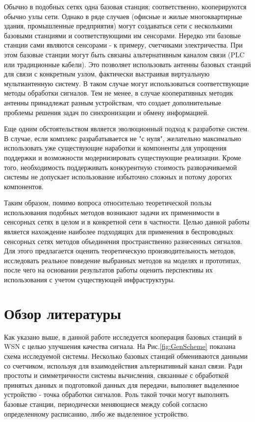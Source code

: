 \documentclass[a4paper,12pt,oneside, abstract=true]{scrartcl}
\begin{document}
Обычно в подобных сетях одна базовая станция; соответственно, кооперируются обычно узлы сети. 
Однако в ряде случаев (офисные и жилые многоквартирные здания, промышленные предприятия) могут создаваться сети с несколькими базовыми станциями и соответствующими им сенсорами. 
Нередко эти базовые станции сами являются сенсорами - к примеру, счетчиками электричества. 
При этом базовые станции могут быть связаны альтернативным каналом связи (PLC или традиционные кабели). 
Это позволяет использовать антенны базовых станций для связи с конкретным узлом, фактически выстраивая виртуальную мультиантенную систему. 
В таком случае могут использоваться соответствующие методы обработки сигналов. 
Тем не менее, в случае кооперативных методик антенны принадлежат разным устройствам, что создает дополнительные проблемы решения задач по синхронизации и обмену информацией. 

Еще одним обстоятельством является эволюционный подход к разработке систем. 
В случае, если комплекс разрабатывается не "с нуля", желательно максимально использовать уже существующие наработки и компоненты для упрощения поддержки и возможности модернизировать существующие реализации. 
Кроме того, необходимость поддерживать конкурентную стоимость разворачиваемой системы не допускает использование избыточно сложных и потому дорогих компонентов.

Таким образом, помимо вопроса относительно теоретической пользы использования подобных методов возникают задачи их применимости в сенсорных сетях в целом и в конкретной сети в частности.
Целью данной работы является нахождение наиболее подходящих для применения в беспроводных сенсорных сетях методов объединения пространственно разнесенных сигналов.
Для этого предлагается оценить теоретическую производительность методов, исследовать реальное поведение выбранных методов на моделях и прототипах, после чего на основании результатов работы оценить перспективы их использования с учетом существующей инфраструктуры.
\clearpage

\section{Обзор литературы}

Как указано выше, в данной работе исследуется кооперация базовых станций в WSN с целью улучшения качества сигнала.
На Рис.\ref{fig:GenScheme} показана схема исследуемой системы. 
Несколько базовых станций обмениваются данными со счетчиком, используя для взаимодействия альтернативный канал связи. 
Ради простоты и симметричности системы вычисления, связанные с обработкой принятых данных и подготовкой данных для передачи, выполняет выделенное устройство - точка обработки сигналов. 
Роль такой точки могут выполнять базовые станции, периодически меняющиеся между собой согласно определенному расписанию, либо же выделенное устройство.
\end{document}
